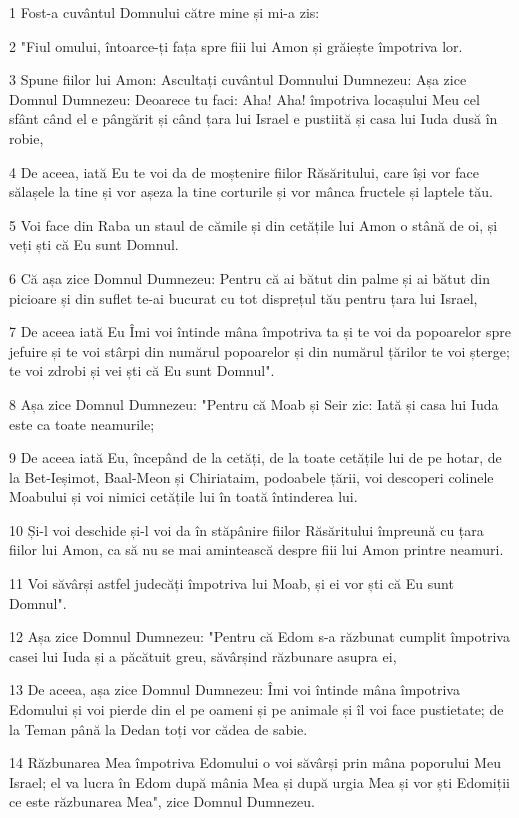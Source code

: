 \par 1 Fost-a cuvântul Domnului către mine și mi-a zis:
\par 2 "Fiul omului, întoarce-ți fața spre fiii lui Amon și grăiește împotriva lor.
\par 3 Spune fiilor lui Amon: Ascultați cuvântul Domnului Dumnezeu: Așa zice Domnul Dumnezeu: Deoarece tu faci: Aha! Aha! împotriva locașului Meu cel sfânt când el e pângărit și când țara lui Israel e pustiită și casa lui Iuda dusă în robie,
\par 4 De aceea, iată Eu te voi da de moștenire fiilor Răsăritului, care își vor face sălașele la tine și vor așeza la tine corturile și vor mânca fructele și laptele tău.
\par 5 Voi face din Raba un staul de cămile și din cetățile lui Amon o stână de oi, și veți ști că Eu sunt Domnul.
\par 6 Că așa zice Domnul Dumnezeu: Pentru că ai bătut din palme și ai bătut din picioare și din suflet te-ai bucurat cu tot disprețul tău pentru țara lui Israel,
\par 7 De aceea iată Eu Îmi voi întinde mâna împotriva ta și te voi da popoarelor spre jefuire și te voi stârpi din numărul popoarelor și din numărul țărilor te voi șterge; te voi zdrobi și vei ști că Eu sunt Domnul".
\par 8 Așa zice Domnul Dumnezeu: "Pentru că Moab și Seir zic: Iată și casa lui Iuda este ca toate neamurile;
\par 9 De aceea iată Eu, începând de la cetăți, de la toate cetățile lui de pe hotar, de la Bet-Ieșimot, Baal-Meon și Chiriataim, podoabele țării, voi descoperi colinele Moabului și voi nimici cetățile lui în toată întinderea lui.
\par 10 Și-l voi deschide și-l voi da în stăpânire fiilor Răsăritului împreună cu țara fiilor lui Amon, ca să nu se mai amintească despre fiii lui Amon printre neamuri.
\par 11 Voi săvârși astfel judecăți împotriva lui Moab, și ei vor ști că Eu sunt Domnul".
\par 12 Așa zice Domnul Dumnezeu: "Pentru că Edom s-a răzbunat cumplit împotriva casei lui Iuda și a păcătuit greu, săvârșind răzbunare asupra ei,
\par 13 De aceea, așa zice Domnul Dumnezeu: Îmi voi întinde mâna împotriva Edomului și voi pierde din el pe oameni și pe animale și îl voi face pustietate; de la Teman până la Dedan toți vor cădea de sabie.
\par 14 Răzbunarea Mea împotriva Edomului o voi săvârși prin mâna poporului Meu Israel; el va lucra în Edom după mânia Mea și după urgia Mea și vor ști Edomiții ce este răzbunarea Mea", zice Domnul Dumnezeu.
